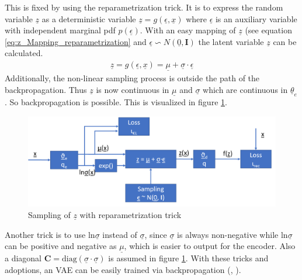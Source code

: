 \documentclass[12pt,DIV14,BCOR12mm,a4paper,footexclude,headinclude,halfparskip-,twoside,openright,cleardoubleempty,idxtotoc,bibtotoc,listtotoc]{scrreprt} %
\numberwithin{equation}{chapter}
\begin{document}
This is fixed by using the reparametrization trick. It is to express the random variable $\underline{z}$ as a deterministic variable $\underline{z} = g(\underline{\epsilon}, \underline{x})$ where $\underline{\epsilon}$ is an auxiliary variable with independent marginal pdf $p(\underline{\epsilon})$. With an easy mapping of $\underline{z}$ (see equation \ref{eq:z_Mapping_reparametrization} and $\underline{\epsilon} \backsim N(\underline{0}, \mathbf{I})$ the latent variable $\underline{z}$ can be calculated.
\begin{align}
	\underline{z} = g(\underline{\epsilon}, \underline{x}) = \underline{\mu} + \underline{\sigma}\cdot\underline{\epsilon}\label{eq:z_Mapping_reparametrization}
\end{align}
Additionally, the non-linear sampling process is outside the path of the backpropagation. Thus $\underline{z}$ is now continuous in $\underline{\mu}$ and $\underline{\sigma}$ which are continuous in $\underline{\theta}_e$. So backpropagation is possible. This is visualized in figure \ref{fig:Sampling_w_reparametrization}.
\begin{figure}[htb!]
	\centering
	\includegraphics[width=0.75\linewidth]{Graphiken/VAE_w_reparametrization}
	\caption{Sampling of $\underline{z}$ with reparametrization trick}
	\label{fig:Sampling_w_reparametrization}
\end{figure}
Another trick is to use $\textrm{ln}\underline{\sigma}$ instead of $\underline{\sigma}$, since $\underline{\sigma}$ is always non-negative while $\textrm{ln}\underline{\sigma}$ can be positive and negative as $\underline{\mu}$, which is easier to output for the encoder. Also a diagonal $\mathbf{C} = \textrm{diag}(\underline{\sigma}\cdot\underline{\sigma})$ is assumed in figure \ref{fig:Sampling_w_reparametrization}. With these tricks and adoptions, an VAE can be easily trained via backpropagation (\cite{Kingma14VAE}, \cite{LectureNotes_DeepLearning}).
\end{document}
